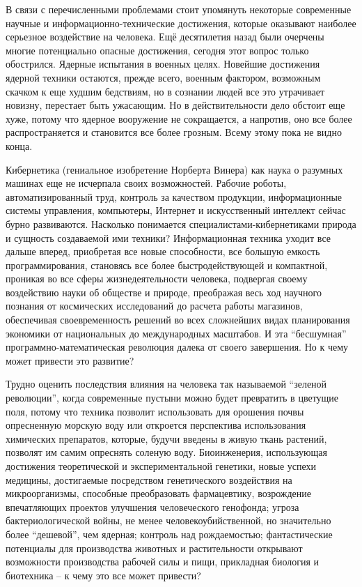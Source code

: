 В связи с перечисленными проблемами стоит упомянуть некоторые современные научные и информационно-технические достижения, которые оказывают наиболее серьезное воздействие на человека. Ещё десятилетия назад были очерчены многие потенциально опасные достижения, сегодня этот вопрос только обострился. Ядерные испытания в военных целях. Новейшие достижения ядерной техники остаются, прежде всего, военным фактором, возможным скачком к еще худшим бедствиям, но в сознании людей все это утрачивает новизну, перестает быть ужасающим. Но в действительности дело обстоит еще хуже, потому что ядерное вооружение не сокращается, а напротив, оно все более распространяется и становится все более грозным. Всему этому пока не видно конца.

Кибернетика (гениальное изобретение Норберта Винера) как наука о разумных машинах еще не исчерпала своих возможностей. Рабочие роботы, автоматизированный труд, контроль за качеством продукции, информационные системы управления, компьютеры, Интернет и искусственный интеллект сейчас бурно развиваются. Насколько понимается специалистами-кибернетиками природа и сущность создаваемой ими техники? Информационная техника уходит все дальше вперед, приобретая все новые способности, все большую емкость программирования, становясь все более быстродействующей и компактной, проникая во все сферы жизнедеятельности человека, подвергая своему воздействию науки об обществе и природе, преображая весь ход научного познания от космических исследований до расчета работы магазинов, обеспечивая своевременность решений во всех сложнейших видах планирования экономики от национальных до международных масштабов. И эта ``бесшумная'' программно-математическая революция далека от своего завершения. Но к чему может привести это развитие?

Трудно оценить последствия влияния на человека так называемой ``зеленой революции'', когда современные пустыни можно будет превратить в цветущие поля, потому что техника позволит использовать для орошения почвы опресненную морскую воду или откроется перспектива использования химических препаратов, которые, будучи введены в живую ткань растений, позволят им самим опреснять соленую воду.  Биоинженерия, использующая достижения теоретической и экспериментальной генетики, новые успехи медицины, достигаемые посредством генетического воздействия на микроорганизмы, способные преобразовать фармацевтику, возрождение впечатляющих проектов улучшения человеческого генофонда; угроза бактериологической войны, не менее человекоубийственной, но значительно более ``дешевой'', чем ядерная; контроль над рождаемостью; фантастические потенциалы для производства животных и растительности открывают возможности производства рабочей силы и пищи, прикладная биология и биотехника -- к чему это все может привести?


